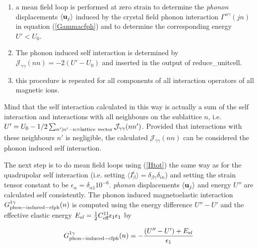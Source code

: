 \begin{description}
\begin{description}
\begin{description}
\begin{enumerate}
   \item a mean field loop is performed at zero strain to determine the {\em phonon}
         displacements $\langle \mathbf u_{j} \rangle$ induced by the crystal field phonon
         interaction $\Gamma^{\alpha\gamma}(jn)$ in equation (\ref{Gammacfph}) and
         to determine the corresponding energy $U'<U_0$.
   \item The phonon induced self interaction is determined 
         by $\mathcal J_{\gamma\gamma}(nn)=-2(U'-U_0)$ and inserted in the output of
         {\prg reduce\_unitcell}.
   \item this procedure is repeated for all components of all interaction operators 
         of all magnetic ions.
  \end{enumerate}
  Mind that the self interaction calculated in this way is actually a sum of the self
  interaction and interactions with all neighbours on the sublattice $n$, i.e.
  $U'=U_0 -1/2 \sum_{n' | n'-n=\rm lattice\ vector} \mathcal J_{\gamma\gamma}(nn')$.
  Provided that
  interactions with these neighbours $n'$ is negligible, the calculated $\mathcal J_{\gamma\gamma}(nn)$
  can be considered the phonon induced self interaction.
\item[Calculation of effective  phonon induced Magnetoelastic Interactions ]
  The next step is to do mean field loops using (\ref{Htot}) the same way as for the 
  quadrupolar self interaction (i.e. setting 
          $\langle I^i_{\beta}\rangle=\delta_{\beta\gamma}\delta_{in}$) 
  and setting the strain tensor constant 
  to be $\epsilon_{\alpha}=\delta_{\alpha1} 10^{-6}$. {\em phonon}
         displacements $\langle \mathbf u_{j} \rangle$ and energy $U''$ are calculated
   self consistently. The phonon induced magnetoelastic interaction 
     $G^{1\gamma}_{\rm phon-induced-cfph}(n)$ is computed
   using the energy difference $U''-U'$ and the effective elastic energy 
   $E_{el}=\frac{1}{2}C_{\rm eff}^{11}\epsilon_{1}\epsilon_{1}$
   by

   \begin{equation}
    G^{1\gamma}_{\rm phon-induced-cfph}(n)=-\frac{(U''-U')+E_{el}}{\epsilon_{1}}
   \end{equation}
   

\end{description}
\end{description}
\end{description}
